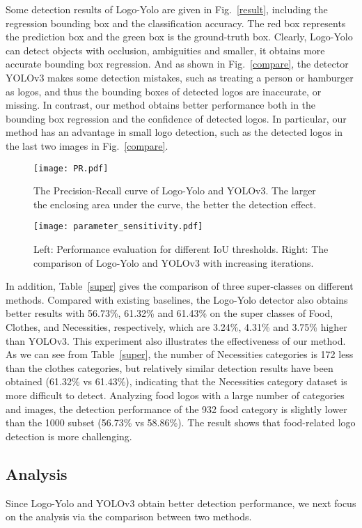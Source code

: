 \documentclass[journal]{IEEEtran}
\begin{document}
Some detection results of Logo-Yolo are given in Fig.~\ref{result}, including the regression bounding box and the classification accuracy. The red box represents the prediction box and the green box is the ground-truth box. Clearly, Logo-Yolo can detect objects with occlusion, ambiguities and smaller, it obtains more accurate bounding box regression. And as shown in Fig.~\ref{compare}, the detector YOLOv3 makes some detection mistakes, such as treating a person or hamburger as logos, and thus the bounding boxes of detected logos are inaccurate, or missing. In contrast, our method obtains better performance both in the bounding box regression and the confidence of detected logos. In particular, our method has an advantage in small logo detection, such as the detected logos in the last two images in Fig.~\ref{compare}. 
\begin{figure*}[!t]
	\centering
	\texttt{[image: PR.pdf]}
	\caption{The Precision-Recall curve of Logo-Yolo and YOLOv3. The larger the enclosing area under the curve, the better the detection effect.}
	\label{PR}
\end{figure*}
\begin{figure*}[!t]
	\centering
	\texttt{[image: parameter\_sensitivity.pdf]}
	\caption{Left: Performance evaluation for different IoU thresholds. Right: The comparison of Logo-Yolo and YOLOv3 with increasing iterations.}
	\label{parameter_sensitivity}
\end{figure*}

In addition, Table~\ref{super} gives the comparison of three super-classes on different methods. Compared with existing baselines, the Logo-Yolo detector also obtains better results with 56.73\%, 61.32\% and 61.43\% on the super classes of Food, Clothes, and Necessities, respectively, which are 3.24\%, 4.31\% and 3.75\% higher than YOLOv3. This experiment also illustrates the effectiveness of our method. As we can see from Table~\ref{super}, the number of Necessities categories is 172 less than the clothes categories, but relatively similar detection results have been obtained (61.32\% vs 61.43\%), indicating that the Necessities category dataset is more difficult to detect. Analyzing food logos with a large number of categories and images, the detection performance of the 932 food category is slightly lower than the 1000 subset (56.73\% vs 58.86\%). The result shows that food-related logo detection is more challenging. 


\subsection{Analysis}
Since Logo-Yolo and YOLOv3 obtain better detection performance, we next focus on the analysis via the comparison between two methods.
\end{document}
